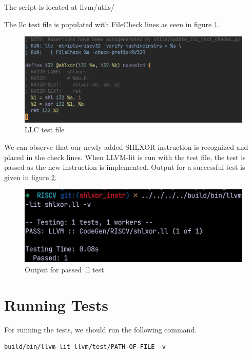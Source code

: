 The script is located at llvm/utils/

The llc test file is populated with FileCheck lines as seen in figure \ref{fig:llc_test_file}.
\begin{figure}
    \centering
    \includegraphics{testing/llc_test_file.png}
    \caption{LLC test file}
    \label{fig:llc_test_file}
\end{figure}

We can observe that our newly added SHLXOR instruction is recognized and placed in the check lines. When LLVM-lit is run with the test file, the test is passed as the new instruction is implemented. Output for a successful test is given in figure \ref{fig:output_for_passed_ll_test}.
\begin{figure}
    \centering
    \includegraphics{testing/output_for_passed_ll_test.png}
    \caption{Output for passed .ll test}
    \label{fig:output_for_passed_ll_test}
\end{figure}

\section{Running Tests}
For running the tests, we should run the following command.

\begin{lstlisting}
build/bin/llvm-lit llvm/test/PATH-OF-FILE -v
\end{lstlisting}
